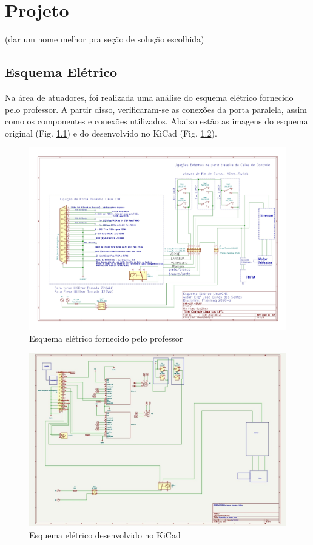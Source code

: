 \chapter{Projeto}

(dar um nome melhor pra seção de solução escolhida)


\section{Esquema Elétrico}
Na área de atuadores, foi realizada uma análise do esquema elétrico fornecido pelo professor. A partir disso, verificaram-se as conexões da porta paralela, assim como os componentes e conexões utilizados. Abaixo estão as imagens do esquema original (Fig. \ref{fig:prof_schematic}) e do desenvolvido no KiCad (Fig. \ref{fig:kicad_schematic}).

\begin{figure}[H]
    \centering
    \includegraphics[width=\textwidth]{images/kicad-prof.jpg}
    \caption{Esquema elétrico fornecido pelo professor}
    \label{fig:prof_schematic}
\end{figure}

\begin{figure}[H]
    \centering
    \includegraphics[width=\textwidth]{images/nosso-kicad.jpg}
    \caption{Esquema elétrico desenvolvido no KiCad}
    \label{fig:kicad_schematic}
\end{figure}

